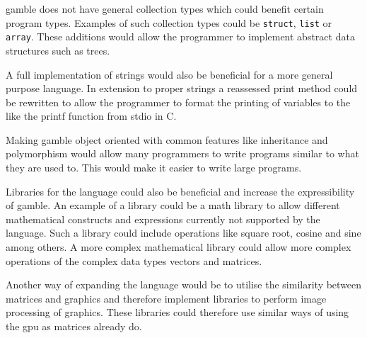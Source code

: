 \gls{gamble} does not have general collection types which could benefit certain program types.
Examples of such collection types could be \texttt{struct}, \texttt{list} or \texttt{array}.
These additions would allow the programmer to implement abstract data structures such as trees.

A full implementation of strings would also be beneficial for a more general purpose language.
In extension to proper strings a reassessed print method could be rewritten to allow the programmer to format the printing of variables to the like the printf function from stdio in C.

Making \gls{gamble} object oriented with common features like inheritance and polymorphism would allow many programmers to write programs similar to what they are used to.
This would make it easier to write large programs. 

Libraries for the language could also be beneficial and increase the expressibility of \gls{gamble}.
An example of a library could be a math library to allow different mathematical constructs and expressions currently not supported by the language.
Such a library could include operations like square root, cosine and sine among others.
A more complex mathematical library could allow more complex operations of the complex data types vectors and matrices.

Another way of expanding the language would be to utilise the similarity between matrices and graphics and therefore implement libraries to perform image processing of graphics.
These libraries could therefore use similar ways of using the \acrshort{gpu} as matrices already do.

